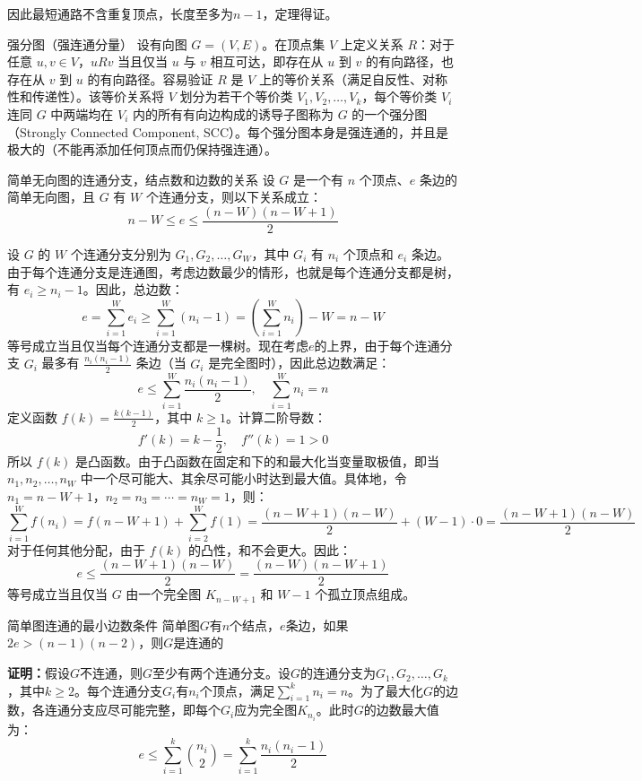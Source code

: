     因此最短通路不含重复顶点，长度至多为$n-1$，定理得证。
\begin{definition}{强分图（强连通分量）}{}
    设有向图 $G = (V, E)$。在顶点集 $V$ 上定义关系 $R$：对于任意 $u, v \in V$，$u R v$ 当且仅当 $u$ 与 $v$ 相互可达，即存在从 $u$ 到 $v$ 的有向路径，也存在从 $v$ 到 $u$ 的有向路径。容易验证 $R$ 是 $V$ 上的等价关系（满足自反性、对称性和传递性）。该等价关系将 $V$ 划分为若干个等价类 $V_1, V_2, \dots, V_k$，每个等价类 $V_i$ 连同 $G$ 中两端均在 $V_i$ 内的所有有向边构成的诱导子图称为 $G$ 的一个强分图（Strongly Connected Component, SCC）。每个强分图本身是强连通的，并且是极大的（不能再添加任何顶点而仍保持强连通）。
\end{definition}
\begin{theorem}{简单无向图的连通分支，结点数和边数的关系}{}
设 $G$ 是一个有 $n$ 个顶点、$e$ 条边的简单无向图，且 $G$ 有 $W$ 个连通分支，则以下关系成立：
\[n - W\leqslant e\leqslant \dfrac{(n-W)(n-W+1)}{2}\]
\end{theorem}
设 $G$ 的 $W$ 个连通分支分别为 $G_1, G_2, \ldots, G_W$，其中 $G_i$ 有 $n_i$ 个顶点和 $e_i$ 条边。由于每个连通分支是连通图，考虑边数最少的情形，也就是每个连通分支都是树，有 $e_i \geqslant n_i - 1$。因此，总边数：
   \[
   e = \sum_{i=1}^W e_i \geqslant \sum_{i=1}^W (n_i - 1) = \left(\sum_{i=1}^W n_i\right) - W = n - W
   \]
等号成立当且仅当每个连通分支都是一棵树。现在考虑$e$的上界，由于每个连通分支 $G_i$ 最多有 $\frac{n_i(n_i-1)}{2}$ 条边（当 $G_i$ 是完全图时），因此总边数满足：
   \[
   e \leqslant \sum_{i=1}^W \frac{n_i(n_i-1)}{2},\quad\sum_{i=1}^W n_i = n
   \]
   定义函数 $f(k) = \frac{k(k-1)}{2}$，其中 $k \geqslant 1$。计算二阶导数：
   \[
   f'(k) = k - \frac{1}{2}, \quad f''(k) = 1 > 0
   \]
   所以 $f(k)$ 是凸函数。由于凸函数在固定和下的和最大化当变量取极值，即当 $n_1, n_2, \ldots, n_W$ 中一个尽可能大、其余尽可能小时达到最大值。具体地，令 $n_1 = n-W+1$，$n_2 = n_3 = \cdots = n_W = 1$，则：
   \[
   \sum_{i=1}^W f(n_i) = f(n-W+1) + \sum_{i=2}^W f(1) = \frac{(n-W+1)(n-W)}{2} + (W-1) \cdot 0 = \frac{(n-W+1)(n-W)}{2}
   \]
   对于任何其他分配，由于 $f(k)$ 的凸性，和不会更大。因此：
   \[
   e \leqslant \frac{(n-W+1)(n-W)}{2} = \frac{(n-W)(n-W+1)}{2}
   \]
   等号成立当且仅当 $G$ 由一个完全图 $K_{n-W+1}$ 和 $W-1$ 个孤立顶点组成。
\begin{theorem}{简单图连通的最小边数条件}{}
    简单图$G$有$n$个结点，$e$条边，如果$2e>(n-1)(n-2)$，则$G$是连通的
\end{theorem}
\textbf{证明：}假设$G$不连通，则$G$至少有两个连通分支。设$G$的连通分支为$G_1, G_2, \ldots, G_k$，其中$k \geqslant 2$。每个连通分支$G_i$有$n_i$个顶点，满足$\sum_{i=1}^k n_i = n$。为了最大化$G$的边数，各连通分支应尽可能完整，即每个$G_i$应为完全图$K_{n_i}$。此时$G$的边数最大值为：
\[
e \leqslant \sum_{i=1}^k \binom{n_i}{2} = \sum_{i=1}^k \frac{n_i(n_i-1)}{2}
\]

